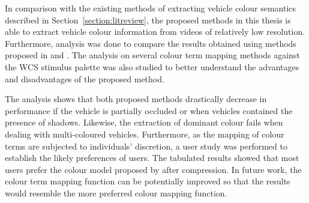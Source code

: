 In comparison with the existing methods of extracting vehicle colour semantics described in Section~\ref{section:litreview}, the proposed methods in this thesis is able to extract vehicle colour information from videos of relatively low resolution.
Furthermore, analysis was done to compare the results obtained using methods proposed in \versionOneExt and \versionTwoExt. The analysis on several colour term mapping methods against the WCS stimulus palette was also studied to better understand the advantages and disadvantages of the proposed method.

The analysis shows that both proposed methods drastically decrease in performance if the vehicle is partially occluded or when vehicles contained the presence of shadows. Likewise, the extraction of dominant colour fails when dealing with multi-coloured vehicles.
Furthermore, as the mapping of colour terms are subjected to individuals' discretion, a user study was performed to establish the likely preferences of users. The tabulated results showed that most users prefer the colour model proposed by  after compression.
In future work, the colour term mapping function can be potentially improved so that the results would resemble the more preferred colour mapping function.

